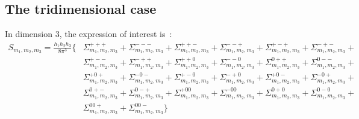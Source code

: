 \subsection{The tridimensional case}
In dimension 3, the expression of interest is~:
\begin{align*}
S_{m_1,m_2,m_3}=\frac{h_1h_2h_3}{8\pi^3}\Big\{
 &   \Sigma_{m_1,m_2,m_3}^{+++} + \Sigma_{m_1,m_2,m_3}^{---} +
     \Sigma_{m_1,m_2,m_3}^{++-} + \Sigma_{m_1,m_2,m_3}^{--+} +
     \Sigma_{m_1,m_2,m_3}^{+-+} + \Sigma_{m_1,m_2,m_3}^{-+-} + \\
 &   \Sigma_{m_1,m_2,m_3}^{+--} + \Sigma_{m_1,m_2,m_3}^{-++} +
     \Sigma_{m_1,m_2,m_3}^{++0} + \Sigma_{m_1,m_2,m_3}^{--0} +
     \Sigma_{m_1,m_2,m_3}^{0++} + \Sigma_{m_1,m_2,m_3}^{0--} + \\
 &   \Sigma_{m_1,m_2,m_3}^{+0+} + \Sigma_{m_1,m_2,m_3}^{-0-} +
     \Sigma_{m_1,m_2,m_3}^{+-0} + \Sigma_{m_1,m_2,m_3}^{-+0} +
     \Sigma_{m_1,m_2,m_3}^{+0-} + \Sigma_{m_1,m_2,m_3}^{-0+} + \\
 &   \Sigma_{m_1,m_2,m_3}^{0+-} + \Sigma_{m_1,m_2,m_3}^{0-+} +
     \Sigma_{m_1,m_2,m_3}^{+00} + \Sigma_{m_1,m_2,m_3}^{-00} +
     \Sigma_{m_1,m_2,m_3}^{0+0} + \Sigma_{m_1,m_2,m_3}^{0-0} + \\
 &   \Sigma_{m_1,m_2,m_3}^{00+} + \Sigma_{m_1,m_2,m_3}^{00-}
\Big\}
\end{align*}

\newcommand{\sigmaThree}[3]{%
  \ifnum#1=-1\relax
     \sum_{k1=-N}^{-1}
  \fi
  \ifnum#1=1\relax
     \sum_{k1=1}^{N}
  \fi
  \ifnum#2=-1\relax
     \sum_{k2=-N}^{-1}
  \fi
  \ifnum#2=1\relax
     \sum_{k2=1}^{N}
  \fi
  \ifnum#3=-1\relax
     \sum_{k3=-N}^{-1}
  \fi
  \ifnum#3=1\relax
     \sum_{k3=1}^{N}
  \fi
  \delta(
    \ifnum#1=0\relax0\else k_1h_1\fi,
    \ifnum#2=0\relax0\else k_2h_2\fi,
    \ifnum#3=0\relax0\else k_3h_3\fi
  ) E_{m_1,m_2,m_3}(
    \ifnum#1=0\relax0\else k_1\fi,
    \ifnum#2=0\relax0\else k_2\fi,
    \ifnum#3=0\relax0\else k_3\fi
  )
}

